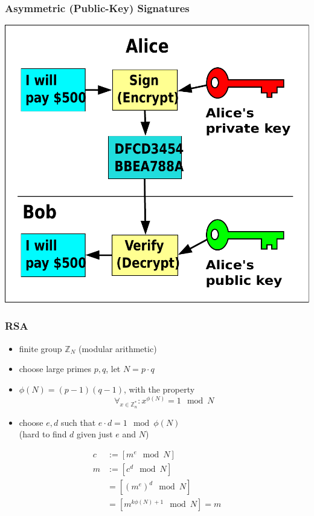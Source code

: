 \documentclass{beamer}
\begin{document}
\begin{frame}
  \frametitle{Asymmetric (Public-Key) Signatures}

\includegraphics[height=0.5\textheight]{Public_key_signing}

\end{frame}

\begin{frame}
  \frametitle{RSA}

  \begin{itemize}
    \item finite group $\mathbb{Z}_N$ (modular arithmetic)
    \item choose large primes $p, q$, let $N = p \cdot q$
    \item $\phi(N) = (p - 1)(q - 1)$, with the property $$\forall_{x\in\mathbb{Z}^*_n}: x^{\phi(N)} = 1 \mod N$$
    \item choose $e, d$ such that $e \cdot d = 1 \mod \phi(N)$\\
    (hard to find $d$ given just $e$ and $N$)
  \end{itemize}
  \begin{align*}
  c &:= [m^e \mod N]\\
  m &:= [c^d \mod N]\\
    &= [(m^e)^d \mod N]\\
    &= [m^{k\phi(N) + 1} \mod N] = m
  \end{align*}
\end{frame}
\end{document}
